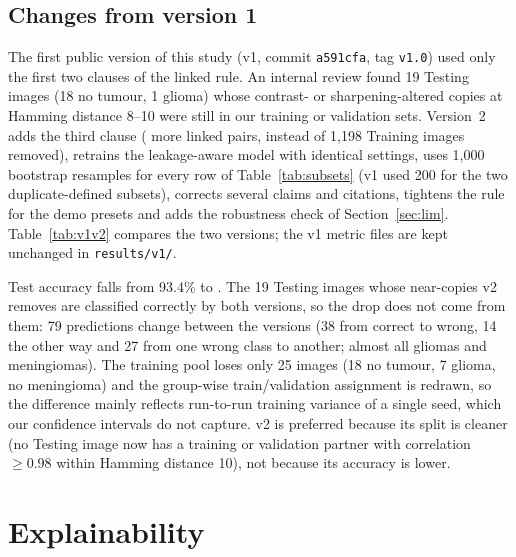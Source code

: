 \documentclass[11pt,a4paper]{article}
\begin{document}
\subsection{Changes from version 1}\label{sec:v1v2}
The first public version of this study (v1, commit \texttt{a591cfa}, tag \texttt{v1.0}) used only the first two clauses of the linked rule. An internal review found 19 Testing images (18 no tumour, 1 glioma) whose contrast- or sharpening-altered copies at Hamming distance 8--10 were still in our training or validation sets. Version~2 adds the third clause (\DExtraPairsVTwoRule{} more linked pairs, \DTrainImgRemovedCrossSplit{} instead of 1{,}198 Training images removed), retrains the leakage-aware model with identical settings, uses 1{,}000 bootstrap resamples for every row of Table~\ref{tab:subsets} (v1 used 200 for the two duplicate-defined subsets), corrects several claims and citations, tightens the rule for the demo presets and adds the robustness check of Section~\ref{sec:lim}. Table~\ref{tab:v1v2} compares the two versions; the v1 metric files are kept unchanged in \texttt{results/v1/}.

Test accuracy falls from 93.4\% to \AccCFull{}. The 19 Testing images whose near-copies v2 removes are classified correctly by both versions, so the drop does not come from them: 79 predictions change between the versions (38 from correct to wrong, 14 the other way and 27 from one wrong class to another; almost all gliomas and meningiomas). The training pool loses only 25 images (18 no tumour, 7 glioma, no meningioma) and the group-wise train/validation assignment is redrawn, so the difference mainly reflects run-to-run training variance of a single seed, which our confidence intervals do not capture. v2 is preferred because its split is cleaner (no Testing image now has a training or validation partner with correlation $\ge 0.98$ within Hamming distance 10), not because its accuracy is lower.

\begin{table}[t]
\centering\small
\caption{Leakage-aware model, v1 (commit \texttt{a591cfa}) versus v2, on the same 1{,}600 Testing images. All values are read from the saved metric files of each version.}
\label{tab:v1v2}
\resizebox{\linewidth}{!}{}
\end{table}

\section{Explainability}
\end{document}
